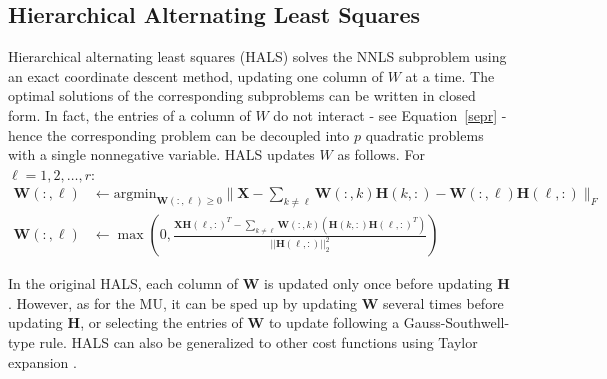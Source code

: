 \documentclass[11pt]{article}
\begin{document}
\subsection{Hierarchical Alternating Least Squares} \label{hals}

Hierarchical alternating least squares (HALS) solves the NNLS subproblem using an exact coordinate descent method, updating one column of $W$ at a time. The optimal solutions of the corresponding subproblems can be written in closed form. In fact, the entries of a column of $W$ do not interact - see Equation~\eqref{sepr} - hence the corresponding problem can be decoupled into $p$ quadratic problems with a single nonnegative variable.  HALS updates $W$ as follows. 
For $\ell = 1, 2, \dots, r$: 
\begin{eqnarray*}
\mathbf{W}(:,\ell) & \leftarrow \textrm{argmin}_{\mathbf{W}(:, \ell) \geq 0} \Big\|\mathbf{X}-\sum_{k\neq \ell} \mathbf{W}(:,k)\mathbf{H}(k,:) - \mathbf{W}(:,\ell)\mathbf{H}(\ell,:) \Big\|_F  \\ 
\mathbf{W}(:,\ell) & \leftarrow \max \left(0,  \frac{\mathbf{XH}(\ell,:)^T -\sum_{k\neq \ell} \mathbf{W}(:,k) \left(\mathbf{H}(k,:) \mathbf{H}(\ell,:)^T\right)   }{ ||\mathbf{H}(\ell,:)||_2^2 } \right)
\end{eqnarray*} 

In the original HALS, each column of $\mathbf{W}$ is updated only once before updating $\mathbf{H}$. However, as for the MU, it can be sped up by updating $\mathbf{W}$ several times before updating $\mathbf{H}$, or selecting the entries of $\mathbf{W}$ to update following a Gauss-Southwell-type rule. HALS can also be generalized to other cost functions using Taylor expansion \cite{g83}.
\end{document}
